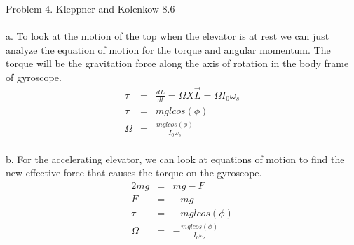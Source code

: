 \documentclass[11pt]{amsart}
\begin{document}
Problem 4. Kleppner and Kolenkow 8.6 \\ \\
a. To look at the motion of the top when the elevator is at rest we can just analyze the equation of motion for the torque and angular momentum. The torque will be the gravitation force along the axis of rotation in the body frame of gyroscope.\\
\begin{eqnarray*} 
\tau &=& \frac{dL}{dt} = \Omega{X}\vec{L} = \Omega{I_{0}}\omega_{s} \\
\tau &=& mglcos(\phi) \\
\Omega &=& \frac{mglcos(\phi)}{I_{0}\omega_{s}} 
\end{eqnarray*} \\
b. For the accelerating elevator, we can look at equations of motion to find the new effective force that causes the torque on the gyroscope. \\
\begin{eqnarray*} 
2mg &=& mg-F \\
F &=& -mg \\
\tau &=& -mglcos(\phi) \\
\Omega &=& -\frac{mglcos(\phi)}{I_{0}\omega_{s}} 
\end{eqnarray*} \\
\end{document}
